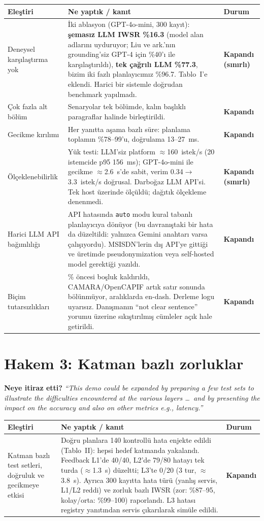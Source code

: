 \documentclass[10pt,a4paper]{article}
\newcommand{\ok}{\textcolor{green!50!black}{\textbf{Kapandı}}}
\newcommand{\limited}{\textcolor{orange!80!black}{\textbf{Kapandı (sınırlı)}}}
\newcommand{\q}[1]{\textit{``#1''}}
\begin{document}
\begin{tabularx}{\textwidth}{>{\raggedright\arraybackslash}p{3.6cm} L l}
\toprule
\textbf{Eleştiri} & \textbf{Ne yaptık / kanıt} & \textbf{Durum} \\
\midrule
Deneysel karşılaştırma yok &
İki ablasyon (GPT-4o-mini, 300 kayıt): \textbf{şemasız LLM IWSR \%16.3} (model alan adlarını uyduruyor;
Liu ve ark.'nın grounding'siz GPT-4 için \%40'ı ile karşılaştırıldı), \textbf{tek çağrılı LLM \%77.3},
bizim iki fazlı planlayıcımız \%96.7. Tablo~I'e eklendi. Harici bir sistemle doğrudan benchmark yapılmadı. & \limited \\
Çok fazla alt bölüm & Senaryolar tek bölümde, kalın başlıklı paragraflar halinde birleştirildi. & \ok \\
Gecikme kırılımı & Her yanıtta aşama bazlı süre: planlama toplamın \%78--99'u, doğrulama 13--27~ms. & \ok \\
Ölçeklenebilirlik &
Yük testi: LLM'siz platform $\approx$160~istek/s (20 istemcide p95 156~ms); GPT-4o-mini ile gecikme
$\approx$2.6~s'de sabit, verim 0.34$\rightarrow$3.3~istek/s doğrusal. Darboğaz LLM API'si. Tek host üzerinde
ölçüldü; dağıtık ölçekleme denenmedi. & \limited \\
Harici LLM API bağımlılığı &
API hatasında \texttt{auto} modu kural tabanlı planlayıcıya dönüyor (bu davranıştaki bir hata da düzeltildi:
yalnızca Gemini anahtarı varsa çalışıyordu). MSISDN'lerin dış API'ye gittiği ve üretimde pseudonymization veya
self-hosted model gerektiği yazıldı. & \ok \\
Biçim tutarsızlıkları &
\% öncesi boşluk kaldırıldı, CAMARA/OpenCAPIF artık satır sonunda bölünmüyor, aralıklarda en-dash. Derleme logu
uyarısız. Danışmanın ``not clear sentence'' yorumu üzerine sıkıştırılmış cümleler açık hale getirildi. & \ok \\
\bottomrule
\end{tabularx}

\section{Hakem 3: Katman bazlı zorluklar}
\textbf{Neye itiraz etti?} \q{This demo could be expanded by preparing a few test sets to illustrate the
difficulties encountered at the various layers \ldots\ and by presenting the impact on the accuracy and also on
other metrics e.g., latency.}

\begin{tabularx}{\textwidth}{>{\raggedright\arraybackslash}p{3.6cm} L l}
\toprule
\textbf{Eleştiri} & \textbf{Ne yaptık / kanıt} & \textbf{Durum} \\
\midrule
Katman bazlı test setleri, doğruluk ve gecikmeye etkisi &
Doğru planlara 140 kontrollü hata enjekte edildi (Tablo~II): hepsi hedef katmanda yakalandı. Feedback L1'de
40/40, L2'de 79/80 hatayı tek turda ($\approx$1.3~s) düzeltti; L3'te 0/20 (3 tur, $\approx$3.8~s). Ayrıca 300
kayıtta hata türü (yanlış servis, L1/L2 reddi) ve zorluk bazlı IWSR (zor: \%87--95, kolay/orta: \%99--100)
raporlandı. L3 hatası registry yanıtından servis çıkarılarak simüle edildi. & \ok \\
\bottomrule
\end{tabularx}
\end{document}
